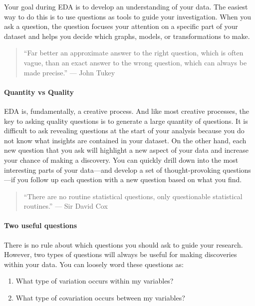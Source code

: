 \documentclass[
]{article}
\providecommand{\tightlist}{%
  \setlength{\itemsep}{0pt}\setlength{\parskip}{0pt}}
\begin{document}
Your goal during EDA is to develop an understanding of your data. The
easiest way to do this is to use questions as tools to guide your
investigation. When you ask a question, the question focuses your
attention on a specific part of your dataset and helps you decide which
graphs, models, or transformations to make.

\begin{quote}
``Far better an approximate answer to the right question, which is often
vague, than an exact answer to the wrong question, which can always be
made precise.'' --- John Tukey
\end{quote}

\hypertarget{quantity-vs-quality}{%
\paragraph{Quantity vs Quality}\label{quantity-vs-quality}}

EDA is, fundamentally, a creative process. And like most creative
processes, the key to asking quality questions is to generate a large
quantity of questions. It is difficult to ask revealing questions at the
start of your analysis because you do not know what insights are
contained in your dataset. On the other hand, each new question that you
ask will highlight a new aspect of your data and increase your chance of
making a discovery. You can quickly drill down into the most interesting
parts of your data---and develop a set of thought-provoking
questions---if you follow up each question with a new question based on
what you find.

\begin{quote}
``There are no routine statistical questions, only questionable
statistical routines.'' --- Sir David Cox
\end{quote}

\hypertarget{two-useful-questions}{%
\paragraph{Two useful questions}\label{two-useful-questions}}

There is no rule about which questions you should ask to guide your
research. However, two types of questions will always be useful for
making discoveries within your data. You can loosely word these
questions as:

\begin{enumerate}
\def\labelenumi{\arabic{enumi}.}
\tightlist
\item
  What type of variation occurs within my variables?
\item
  What type of covariation occurs between my variables?
\end{enumerate}
\end{document}
